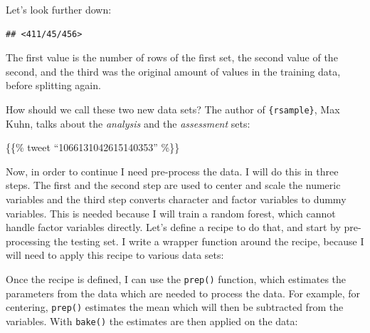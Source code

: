 \documentclass[]{gitbook}
\newenvironment{Shaded}{\begin{snugshade}}{\end{snugshade}}
\newcommand{\ControlFlowTok}[1]{\textcolor[rgb]{0.13,0.29,0.53}{\textbf{#1}}}
\newcommand{\DataTypeTok}[1]{\textcolor[rgb]{0.13,0.29,0.53}{#1}}
\newcommand{\DecValTok}[1]{\textcolor[rgb]{0.00,0.00,0.81}{#1}}
\newcommand{\KeywordTok}[1]{\textcolor[rgb]{0.13,0.29,0.53}{\textbf{#1}}}
\newcommand{\NormalTok}[1]{#1}
\newcommand{\OperatorTok}[1]{\textcolor[rgb]{0.81,0.36,0.00}{\textbf{#1}}}
\newcommand{\StringTok}[1]{\textcolor[rgb]{0.31,0.60,0.02}{#1}}
\theoremstyle{definition}
\theoremstyle{definition}
\theoremstyle{definition}
\theoremstyle{remark}
\begin{document}
Let's look further down:

\begin{Shaded}
\end{Shaded}

\begin{verbatim}
## <411/45/456>
\end{verbatim}

The first value is the number of rows of the first set, the second value
of the second, and the third was the original amount of values in the
training data, before splitting again.

How should we call these two new data sets? The author of
\texttt{\{rsample\}}, Max Kuhn, talks about the \emph{analysis} and the
\emph{assessment} sets:

\{\{\% tweet ``1066131042615140353'' \%\}\}

Now, in order to continue I need pre-process the data. I will do this in
three steps. The first and the second step are used to center and scale
the numeric variables and the third step converts character and factor
variables to dummy variables. This is needed because I will train a
random forest, which cannot handle factor variables directly. Let's
define a recipe to do that, and start by pre-processing the testing set.
I write a wrapper function around the recipe, because I will need to
apply this recipe to various data sets:

\begin{Shaded}
\end{Shaded}

Once the recipe is defined, I can use the \texttt{prep()} function,
which estimates the parameters from the data which are needed to process
the data. For example, for centering, \texttt{prep()} estimates the mean
which will then be subtracted from the variables. With \texttt{bake()}
the estimates are then applied on the data:
\end{document}
